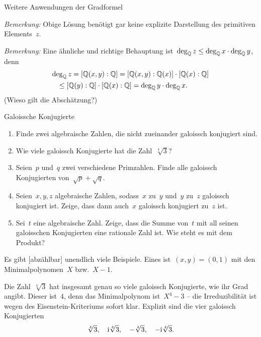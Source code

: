 \documentclass{algblatt}
\begin{document}
\begin{aufgabe}{Weitere Anwendungen der Gradformel}
\begin{loesungE}
\emph{Bemerkung:} Obige Lösung benötigt gar keine explizite Darstellung des
primitiven Elements~$z$.

\emph{Bemerkung:}
Eine ähnliche und richtige Behauptung ist~$\deg_{\mathbb{Q}} z \leq
\deg_{\mathbb{Q}} x \cdot \deg_{\mathbb{Q}} y$, denn
\begin{multline*}\deg_{\mathbb{Q}} z = [\mathbb{Q}(x,y):\mathbb{Q}] = [\mathbb{Q}(x,y):\mathbb{Q}(x)] \cdot
  [\mathbb{Q}(x):\mathbb{Q}] \\ \leq [\mathbb{Q}(y):\mathbb{Q}] \cdot [\mathbb{Q}(x):\mathbb{Q}] =
  \deg_{\mathbb{Q}} y \cdot \deg_{\mathbb{Q}} x. {\qquad}\end{multline*}
(Wieso gilt die Abschätzung?)
\end{loesungE}
\end{aufgabe}

\begin{aufgabe}{Galoissche Konjugierte}
\begin{enumerate}
\item Finde zwei algebraische Zahlen, die nicht zueinander galoissch konjugiert
sind.
\item Wie viele galoissch Konjugierte hat die Zahl~$\sqrt[4]{3}$?
\item Seien~$p$ und~$q$ zwei verschiedene Primzahlen. Finde alle
galoissch Konjugierten von~$\sqrt{p} + \sqrt{q}$.
\item Seien~$x, y, z$ algebraische Zahlen, sodass~$x$ zu~$y$ und~$y$ zu~$z$
galoissch konjugiert ist. Zeige, dass dann auch~$x$ galoissch konjugiert zu~$z$
ist.
\item Sei~$t$ eine algebraische Zahl. Zeige, dass die Summe von~$t$ mit all
seinen galoisschen Konjugierten eine rationale Zahl ist. Wie steht es mit dem
Produkt?
\end{enumerate}

\begin{loesungE}
\item Es gibt [abzählbar] unendlich viele Beispiele. Eines ist~$(x,y) = (0,1)$
mit den Minimalpolynomen~$X$ bzw.~$X-1$.

\item Die Zahl~$\sqrt[4]{3}$ hat insgesamt genau so viele galoissch Konjugierte, wie
ihr Grad angibt. Dieser ist~$4$, denn das Minimalpolynom ist~$X^4 - 3$ -- die
Irreduzibilität ist wegen des Eisenstein-Kriteriums sofort klar.
Explizit sind die vier galoissch Konjugierten
\[ \sqrt[4]{3},\quad \mathrm{i} \sqrt[4]{3},\quad -\sqrt[4]{3},\quad -\mathrm{i} \sqrt[4]{3}. \]


\end{loesungE}
\end{aufgabe}
\end{document}
